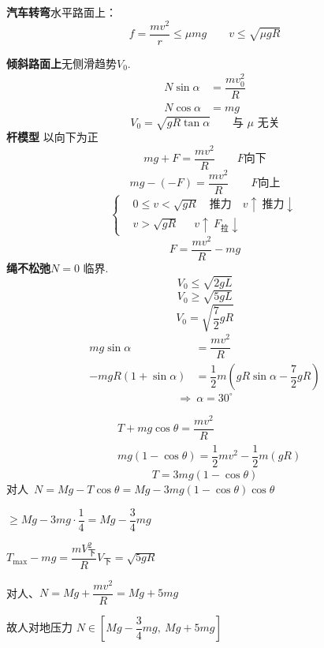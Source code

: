 \textbf{汽车转弯}\quad 水平路面上：
\[ f=\dfrac{mv^2}{r}\le\mu mg\qquad v\le\sqrt{\mu gR} \]

\textbf{倾斜路面上}\quad 无侧滑趋势\quad $V_0$.
\begin{align*}
N\sin\alpha&=\dfrac{mv_0^2}{R}\\
N\cos\alpha&=mg
\end{align*}
\[ V_0=\sqrt{gR\tan\alpha}\qquad\text{与 }\mu\text{ 无关} \]
\textbf{杆模型}
以向下为正
\[ mg+F=\dfrac{mv^2}{R}\qquad F\text{向下} \]
\[ mg-(-F)=\dfrac{mv^2}{R}\qquad F\text{向上} \]
\[
\left\{\begin{aligned}
&0\le v<\sqrt{gR}\quad\text{推力}\quad v\uparrow\ \text{推力}\downarrow\\
&v>\sqrt{gR}\quad\ \ v\uparrow\ F_{\text{拉}}\downarrow
\end{aligned}\right.
\]
\[ F=\dfrac{mv^2}{R}-mg \]
\textbf{绳不松弛}\quad $N=0$ 临界.
\[ V_0\le\sqrt{2gL} \]
\[ V_0\ge\sqrt{5gL} \]
\[ V_0=\sqrt{\dfrac{7}{2}gR} \]
\begin{align*}
mg\sin\alpha&=\dfrac{mv^2}{R}\\
-mgR(1+\sin\alpha)&=\dfrac12m\left(gR\sin\alpha-\dfrac{7}{2}gR\right)
\end{align*}
\[ \Rightarrow\ \alpha=30^\circ \]
\begin{problem}[例]
\begin{solution}
\begin{align*}
&T+mg\cos\theta=\dfrac{mv^2}{R}\\
&mg(1-\cos\theta)=\dfrac12mv^2-\dfrac12m(gR)
\end{align*}
\[ T=3mg(1-\cos\theta) \]
对人\ $N=Mg-T\cos\theta=Mg-3mg(1-\cos\theta)\cos\theta$

$\ge Mg-3mg\cdot\dfrac14=Mg-\dfrac34mg$

$T_{\max}-mg=\dfrac{mV_{\text{下}}^2}{R}$\qquad $V_{\text{下}}=\sqrt{5gR}$

对人、$N=Mg+\dfrac{mv^2}{R}=Mg+5mg$

故人对地压力 $N\in\left[Mg-\dfrac34mg,\ Mg+5mg\right]$
\end{solution}
\end{problem}
